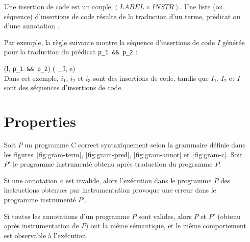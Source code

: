 Une insertion de code est un couple $(LABEL \times INSTR)$.
Une liste (ou séquence) d'insertions de code résulte de la traduction d'un
terme, prédicat ou d'une annotation \eacsl.

Par exemple, la règle suivante montre la séquence d'insertions de code $I$
générée pour la traduction du prédicat \lstinline'p_1 && p_2' :

{
  { (l, \mbox{\lstinline'p_1 && p_2'}) 
    (
    _{I},
    e) }
}~\\

Dans cet exemple, $i_1$, $i_2$ et $i_3$ sont des insertions de code, tandis que
$I_1$, $I_2$ et $I$ sont des séquences d'insertions de code.


\section{Properties}
\label{sec:properties}

\begin{notation}
  Soit $P$ un programme C correct syntaxiquement selon la grammaire définie dans
  les figures~\ref{fig:gram-term}, \ref{fig:gram-pred}, \ref{fig:gram-annot}
  et~\ref{fig:gram-c}.
  Soit $P'$ le programme instrumenté obtenu après traduction du programme $P$.
\end{notation}



\begin{theorem}
  Si une annotation $a$ est invalide, alors l'exécution dans le programme $P$
  des instructions obtenues par instrumentation provoque une erreur dans le
  programme instrumenté $P'$.
\end{theorem}

\begin{theorem}
  Si toutes les annotations d'un programme $P$ sont valides, alors $P$ et $P'$
  (obtenu après instrumentation de $P$) ont la même sémantique, et le même
  comportement est observable à l'exécution.
\end{theorem}



